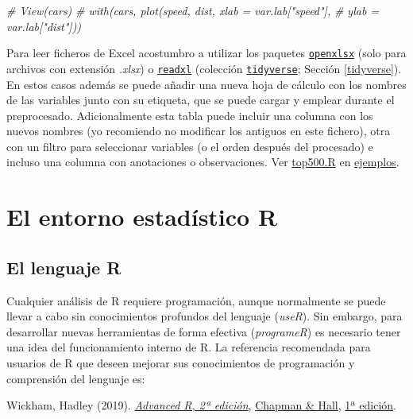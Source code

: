 \documentclass[
]{book}
\newenvironment{Shaded}{\begin{snugshade}}{\end{snugshade}}
\newcommand{\CommentTok}[1]{\textcolor[rgb]{0.56,0.35,0.01}{\textit{#1}}}
\theoremstyle{break}
\theoremstyle{nonumberplain}
\begin{document}
\begin{Shaded}
\begin{Highlighting}[]
\CommentTok{\# View(cars)}
\CommentTok{\# with(cars, plot(speed, dist, xlab = var.lab["speed"], }
\CommentTok{\#                 ylab = var.lab["dist"]))}
\end{Highlighting}
\end{Shaded}

Para leer ficheros de Excel acostumbro a utilizar los paquetes \href{https://cran.r-project.org/web/packages/openxlsx/index.html}{\texttt{openxlsx}} (solo para archivos con extensión \emph{.xlsx}) o \href{https://readxl.tidyverse.org}{\texttt{readxl}} (colección \href{https://www.tidyverse.org/}{\texttt{tidyverse}}; Sección \ref{tidyverse}).
En estos casos además se puede añadir una nueva hoja de cálculo con los nombres de las variables junto con su etiqueta, que se puede cargar y emplear durante el preprocesado.
Adicionalmente esta tabla puede incluir una columna con los nuevos nombres (yo recomiendo no modificar los antiguos en este fichero), otra con un filtro para seleccionar variables (o el orden después del procesado) e incluso una columna con anotaciones o observaciones.
Ver \href{ejemplos/top500/top500.R}{top500.R} en \href{https://github.com/rubenfcasal/book_notasr/tree/main/ejemplos}{ejemplos}.

\hypertarget{part-el-entorno-estaduxedstico-r}{%
\part{El entorno estadístico R}\label{part-el-entorno-estaduxedstico-r}}

\hypertarget{r}{%
\chapter{El lenguaje R}\label{r}}

Cualquier análisis de R requiere programación, aunque normalmente se puede llevar a cabo sin conocimientos profundos del lenguaje (\emph{useR}).
Sin embargo, para desarrollar nuevas herramientas de forma efectiva (\emph{programeR}) es necesario tener una idea del funcionamiento interno de R.
La referencia recomendada para usuarios de R que deseen mejorar sus conocimientos de programación y comprensión del lenguaje es:

Wickham, Hadley (2019). \emph{\href{https://adv-r.hadley.nz/}{Advanced R, 2ª edición}}, \href{https://www.amazon.com/dp/0815384572}{Chapman \& Hall}, \href{http://adv-r.had.co.nz/}{1ª edición}.
\end{document}
